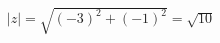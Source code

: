 \documentclass[preview]{standalone}
\begin{document}
\begin{align*}
|z| = \sqrt{   (-3)^2   +   (-1)^2   } =  \sqrt{10 }
\end{align*}
\end{document}
